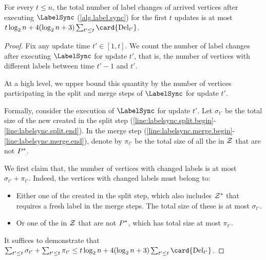 \begin{lemma}\label{lem:number.of.updated.vertices}
    For every $ t\leq n $, the total number of label changes of arrived vertices after executing $ \LabelSync $ (\cref{alg.label.sync}) for the first $ t $ updates is at most $ t\log_{2}n + 4(\log_{2}n + 3)\sum_{t'\leq t} \card{\delt{t'}} $.
\end{lemma}
\newcommand{\newpiecesize}[1]{\sigma_{#1}}
\newcommand{\smallpiecesize}[1]{\pi_{#1}}
\newcommand{\potential}[1]{\mathrm{Budget}(#1)}
\begin{proof}
    Fix any update time $ t'\in [1,t] $.
    We count the number of label changes after executing $ \LabelSync $ for update $ t' $, that is, the number of vertices with different labels between time $ t'-1 $ and $ t' $.

    At a high level, we upper bound this quantity by the number of vertices participating in the split and merge steps of $ \LabelSync $ for update $ t' $.

    Formally, consider the execution of $ \LabelSync $ for update $ t' $.
    Let $ \newpiecesize{t'} $ be the total size of the new  created in the split step (\cref{line:labelsync.split.begin}-\cref{line:labelsync.split.end}). 
    In the merge step (\cref{line:labelsync.merge.begin}-\cref{line:labelsync.merge.end}), denote by $ \smallpiecesize{t'} $ be the total size of all the  in $ \mathcal{Z} $ that are not $ P^* $.

    We first claim that, the number of vertices with changed labels is at most $ \newpiecesize{t'} + \smallpiecesize{t'} $. Indeed, the vertices with changed labels must belong to:
    \begin{itemize}
        \item Either one of the  created in the split step, which also includes  $ \mathcal{Z}^{*} $ that requires a fresh label in the merge steps. The total size of these  is at most $ \newpiecesize{t'} $.
        \item Or one of the  in $ \mathcal{Z} $ that are not $ P^* $, which has total size at most $ \smallpiecesize{t'} $.
    \end{itemize}

    It suffices to demonstrate that $ \sum_{t'\leq t} \newpiecesize{t'} + \sum_{t'\leq t}\smallpiecesize{t'} \leq t \log_{2}n + 4(\log_{2} n + 3) \sum_{t'\leq t}\card{\delt{t'}} $.


\end{proof}

